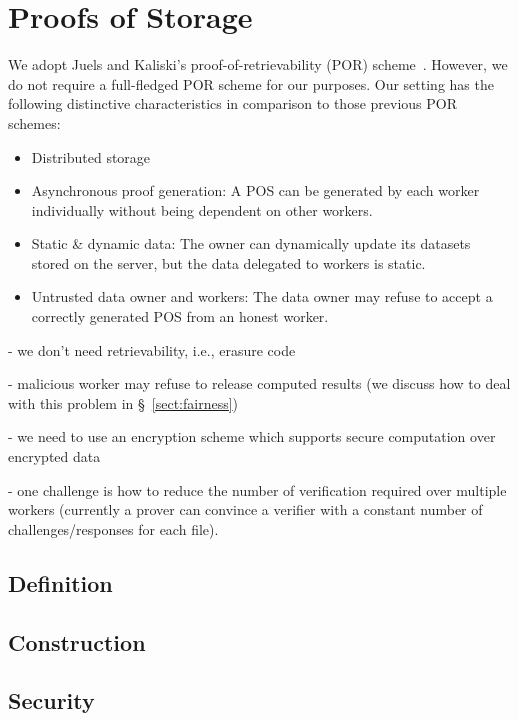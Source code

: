 \section{Proofs of Storage} \label{sect:pos}

We adopt Juels and Kaliski's proof-of-retrievability (POR) scheme~\cite{JK07}.
However, we do not require a full-fledged POR scheme for our purposes.
Our setting has the following distinctive characteristics in comparison to those previous POR schemes:
\begin{itemize}
 \item Distributed storage
 \item Asynchronous proof generation: A POS can be generated by each worker individually without being dependent on other workers.
 \item Static \& dynamic data: The owner can dynamically update its datasets stored on the server, but the data delegated to workers is static.
 \item Untrusted data owner and workers: The data owner may refuse to accept a correctly generated POS from an honest worker.
\end{itemize}

- we don't need retrievability, i.e., erasure code

- malicious worker may refuse to release computed results (we discuss how to deal with this problem in \S~\ref{sect:fairness})

- we need to use an encryption scheme which supports secure computation over encrypted data

- one challenge is how to reduce the number of verification required over multiple workers (currently a prover can convince a verifier with a constant number of challenges/responses for each file).

\subsection{Definition} \label{sect:pos-definition}

\subsection{Construction} \label{sect:pos-construction}

\subsection{Security} \label{sect:security}